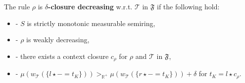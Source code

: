 \begin{definition}
    \noindent
    The rule $\rho$ is
            \textbf{$\delta$-closure decreasing} w.r.t. $\mathcal{T}$ in $\mathfrak{F}$ if the following hold:
            \begin{itemize}
                \item[]- $S$ is strictly monotonic measurable semiring,
                \item[]- $\rho$ is weakly decreasing,
                \item[]- there exists a context closure $c_\rho$ for $\rho$ and $\mathcal{T}$ in $\mathfrak{F}$,
                \item[]- $ \mu(w_\mathcal{T}(\{l \star - = t_K\}))  >_{\mathbb{R}^+}  \mu(w_\mathcal{T}(\{r \star - = t_K\}))  + \delta$ for $t_K = l \star c_\rho$.
            \end{itemize}
\end{definition}


